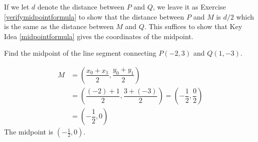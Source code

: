 \medskip


\medskip

If we let $d$ denote the distance between $P$ and $Q$, we leave it as Exercise \ref{verifymidpointformula} to show that the distance between $P$ and $M$ is $d/2$ which is the same as the distance between $M$ and $Q$.  This suffices to show that Key Idea \ref{midpointformula} gives the coordinates of the midpoint.

\medskip

{
Find the midpoint of the line segment connecting $P(-2,3)$ and  $Q(1,-3)$.  
}
{

\begin{align*}
 M & = \left( \dfrac{x_{0}+x_{1}}{2},  \dfrac{y_{0}+y_{1}}{2} \right) \\
   & = \left( \dfrac{(-2)+1}{2},  \dfrac{3+(-3)}{2} \right)  = \left(- \dfrac{1}{2}, \dfrac{0}{2} \right) \\
   & = \left(- \dfrac{1}{2}, 0 \right) 
\end{align*}   
The midpoint is  $\left(- \frac{1}{2}, 0 \right)$.}

{}
